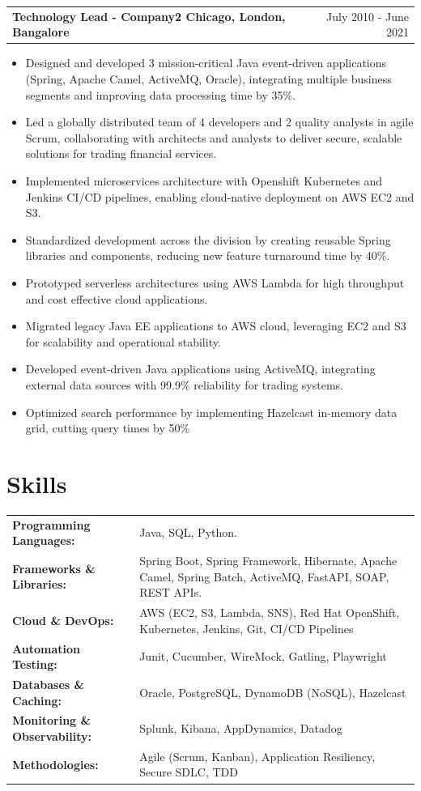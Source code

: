 \documentclass[a4paper,12pt]{article}
\makeatletter
\newenvironment{joblong}[2]
    {
    \begin{tabularx}{\linewidth}{@{}l X r@{}}
    \textbf{#1} & \hfill &  #2 \\[3.75pt]
    \end{tabularx}
    \begin{minipage}[t]{\linewidth}
    \begin{itemize}[nosep,after=\strut, leftmargin=1em, itemsep=3pt,label=--]
    }
    {
    \end{itemize}
    \end{minipage}    
    }
\makeatother
\begin{document}
\begin{joblong}{Technology Lead - Company2 Chicago, London, Bangalore}{July 2010 - June 2021}
\item Designed and developed 3 mission-critical Java event-driven applications (Spring, Apache Camel, ActiveMQ, Oracle), integrating multiple business segments and improving data processing time by 35\%.
\item Led a globally distributed team of 4 developers and 2 quality analysts in agile Scrum, collaborating with architects and analysts to deliver secure, scalable solutions for trading financial services.
\item Implemented microservices architecture with Openshift Kubernetes and Jenkins CI/CD pipelines, enabling cloud-native deployment on AWS EC2 and S3.
\item Standardized development across the division by creating reusable Spring libraries and components, reducing new feature turnaround time by 40\%.
\item Prototyped serverless architectures using AWS Lambda for high throughput and cost effective cloud applications.
\item Migrated legacy Java EE applications to AWS cloud, leveraging EC2 and S3 for scalability and operational stability.
\item Developed event-driven Java applications using ActiveMQ, integrating external data sources with 99.9\% reliability for trading systems.
\item Optimized search performance by implementing Hazelcast in-memory data grid, cutting query times by 50\%
\end{joblong}
\section{Skills}
\begin{tabularx}{\linewidth}{@{} l >{\raggedright\arraybackslash}X @{}}
\textbf{Programming Languages:} & Java, SQL, Python. \\
\textbf{Frameworks \& Libraries:} & Spring Boot, Spring Framework, Hibernate, Apache Camel, Spring Batch, ActiveMQ, FastAPI, SOAP, REST APIs. \\
\textbf{Cloud \& DevOps:} & AWS (EC2, S3, Lambda, SNS), Red Hat OpenShift, Kubernetes, Jenkins, Git, CI/CD Pipelines \\
\textbf{Automation Testing:} & Junit, Cucumber, WireMock, Gatling, Playwright \\
\textbf{Databases \& Caching:} & Oracle, PostgreSQL, DynamoDB (NoSQL), Hazelcast \\
\textbf{Monitoring \& Observability:} & Splunk, Kibana, AppDynamics, Datadog \\
\textbf{Methodologies:} & Agile (Scrum, Kanban), Application Resiliency, Secure SDLC, TDD \\
\end{tabularx}
\end{document}
